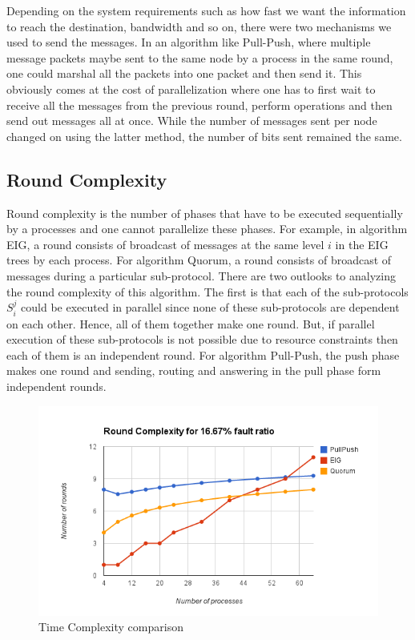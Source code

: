 Depending on the system requirements such as how fast we want the information to reach the destination, bandwidth and so on, there were two mechanisms we used to send the messages. In an algorithm like Pull-Push, where multiple message packets maybe sent to the same node by a process in the same round, one could marshal all the packets into one packet and then send it. This obviously comes at the cost of parallelization where one has to first wait to receive all the messages from the previous round, perform operations and then send out messages all at once. While the number of messages sent per node changed on using the latter method, the number of bits sent remained the same.


\subsection{Round Complexity}
Round complexity is the number of phases that have to be executed sequentially by a processes and one cannot parallelize these phases. For example, in algorithm EIG, a round consists of broadcast of messages at the same level $i$ in the EIG trees by each process. For algorithm Quorum, a round consists of broadcast of messages during a particular sub-protocol. There are two outlooks to analyzing the round complexity of this algorithm. The first is that each of the sub-protocols $S_i^j$ could be executed in parallel since none of these sub-protocols are dependent on each other. Hence, all of them together make one round. But, if parallel execution of these sub-protocols is not possible due to resource constraints then each of them is an independent round. For algorithm Pull-Push, the push phase makes one round and sending, routing and answering in the pull phase form independent rounds.

\begin{figure}[ht]
 \centering
\includegraphics[scale=0.4]{Round16}
\caption{Time Complexity comparison}
 \label{fig:round16}
\end{figure}

